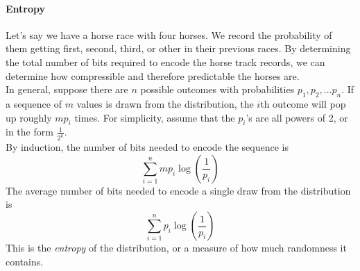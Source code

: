 \paragraph{Entropy}
Let's say we have a horse race with four horses.
We record the probability of them getting first, second, third, or other in their previous races.
By determining the total number of bits required to encode the horse track records, we can determine how compressible and therefore predictable the horses are.\\
In general, suppose there are $n$ possible outcomes with probabilities $p_1, p_2, \ldots p_n$.
If a sequence of $m$ values is drawn from the distribution, the $i$th outcome will pop up roughly $mp_i$ times.
For simplicity, assume that the $p_i$'s are all powers of 2, or in the form $\frac{1}{2^k}$.\\
By induction, the number of bits needed to encode the sequence is $$\sum_{i=1}^n mp_i \log (\frac{1}{p_i})$$
The average number of bits needed to encode a single draw from the distribution is $$\sum_{i=1}^n p_i \log (\frac{1}{p_i})$$
This is the \textit{entropy} of the distribution, or a measure of how much randomness it contains.

